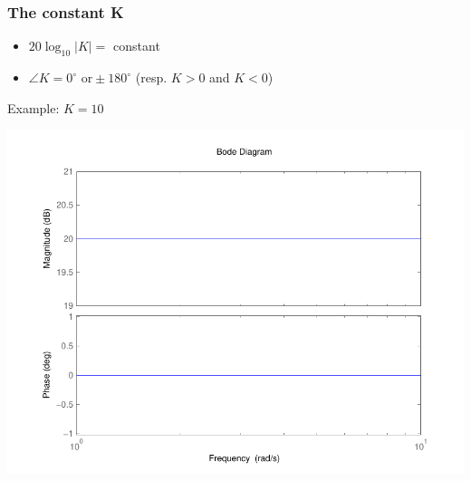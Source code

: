 \begin{frame}
\frametitle{The constant K}
\begin{itemize}
\item $20\log_{10}|K| =$ constant
\item $\angle K = 0^{\circ} \text{ or} \pm 180^{\circ}$  (resp. $K > 0$ and $K < 0$)
\end{itemize}
Example: $K = 10$

\begin{center}
\includegraphics[scale=0.45]{BodeConstant}
\end{center}

\end{frame}



